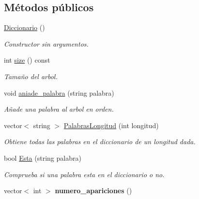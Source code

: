 \subsection*{Métodos públicos}
\begin{DoxyCompactItemize}
\item 
\hyperlink{class_diccionario_aa0a2191ec706b256c35b5229cc197b15}{Diccionario} ()\hypertarget{class_diccionario_aa0a2191ec706b256c35b5229cc197b15}{}\label{class_diccionario_aa0a2191ec706b256c35b5229cc197b15}

\begin{DoxyCompactList}\small\item\em Constructor sin argumentos. \end{DoxyCompactList}\item 
int \hyperlink{class_diccionario_abe2e0023732c4cef7f6960120e8cde39}{size} () const \hypertarget{class_diccionario_abe2e0023732c4cef7f6960120e8cde39}{}\label{class_diccionario_abe2e0023732c4cef7f6960120e8cde39}

\begin{DoxyCompactList}\small\item\em Tamaño del arbol. \end{DoxyCompactList}\item 
void \hyperlink{class_diccionario_adba8626f3f9b28f6d552e29b79b50670}{aniade\+\_\+palabra} (string palabra)
\begin{DoxyCompactList}\small\item\em Añade una palabra al arbol en orden. \end{DoxyCompactList}\item 
vector$<$ string $>$ \hyperlink{class_diccionario_a11f24f812f9aab727dc5ef088aa0d45b}{Palabras\+Longitud} (int longitud)
\begin{DoxyCompactList}\small\item\em Obtiene todas las palabras en el diccionario de un longitud dada. \end{DoxyCompactList}\item 
bool \hyperlink{class_diccionario_a2091d415bc53c34a0e78e7bd9b073024}{Esta} (string palabra)
\begin{DoxyCompactList}\small\item\em Comprueba si una palabra esta en el diccionario o no. \end{DoxyCompactList}\item 
vector$<$ int $>$ {\bfseries numero\+\_\+apariciones} ()\hypertarget{class_diccionario_a7d99352bef3598e14e00c16411434d06}{}\label{class_diccionario_a7d99352bef3598e14e00c16411434d06}


\end{DoxyCompactItemize}
